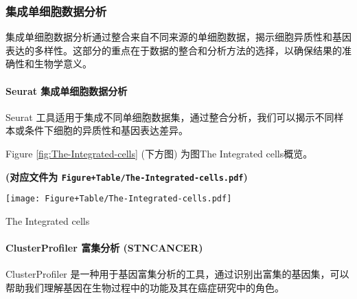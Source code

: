 \documentclass[
]{article}
\begin{document}
\hypertarget{ux96c6ux6210ux5355ux7ec6ux80deux6570ux636eux5206ux6790}{%
\subsubsection{集成单细胞数据分析}\label{ux96c6ux6210ux5355ux7ec6ux80deux6570ux636eux5206ux6790}}

集成单细胞数据分析通过整合来自不同来源的单细胞数据，揭示细胞异质性和基因表达的多样性。这部分的重点在于数据的整合和分析方法的选择，以确保结果的准确性和生物学意义。

\hypertarget{seurat-ux96c6ux6210ux5355ux7ec6ux80deux6570ux636eux5206ux6790}{%
\paragraph{Seurat 集成单细胞数据分析}\label{seurat-ux96c6ux6210ux5355ux7ec6ux80deux6570ux636eux5206ux6790}}

Seurat 工具适用于集成不同单细胞数据集，通过整合分析，我们可以揭示不同样本或条件下细胞的异质性和基因表达差异。

\begin{center}\vspace{1.5cm}\end{center}

Figure \ref{fig:The-Integrated-cells} (下方图) 为图The Integrated cells概览。

\textbf{(对应文件为 \texttt{Figure+Table/The-Integrated-cells.pdf})}

\def\@captype{figure}
\begin{center}
\texttt{[image: Figure+Table/The-Integrated-cells.pdf]}
\caption{The Integrated cells}\label{fig:The-Integrated-cells}
\end{center}

\begin{center}\vspace{1.5cm}\end{center}

\hypertarget{clusterprofiler-ux5bccux96c6ux5206ux6790-stncancer}{%
\paragraph{ClusterProfiler 富集分析 (STNCANCER)}\label{clusterprofiler-ux5bccux96c6ux5206ux6790-stncancer}}

ClusterProfiler 是一种用于基因富集分析的工具，通过识别出富集的基因集，可以帮助我们理解基因在生物过程中的功能及其在癌症研究中的角色。
\end{document}

